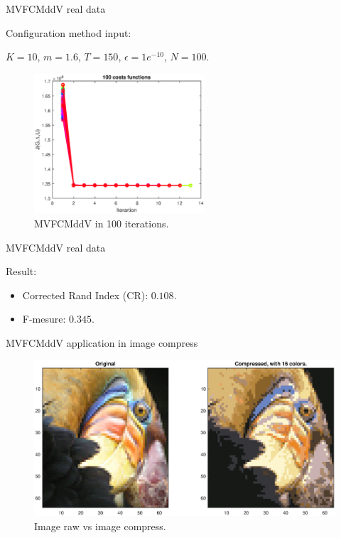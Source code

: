 \documentclass{beamer}
\begin{document}
\begin{frame}{MVFCMddV real data}

Configuration method input:
 
$K =10$, $m = 1.6$, $T = 150$, $\epsilon = 1e^{-10}$, $N = 100$.

\begin{figure}[h]
\centering
\includegraphics[width=2.5in]{../out/cost-function-mvfcmddv.eps}
\caption{MVFCMddV in 100 iterations.}
\label{fig:data_base}
\end{figure}

\end{frame}

\begin{frame}{MVFCMddV real data}

Result: 
\begin{itemize}
\item Corrected Rand Index (CR): $0.108$.
\item F-mesure: $0.345$. 
\end{itemize}

\end{frame}




\begin{frame}{MVFCMddV application in image compress}
\begin{figure}[h]
\centering
\includegraphics[width=4.5in]{../out/image-compress-16.eps}
\caption{Image raw vs image compress.}
\label{fig:image_compress}
\end{figure}
\end{frame}
\end{document}
